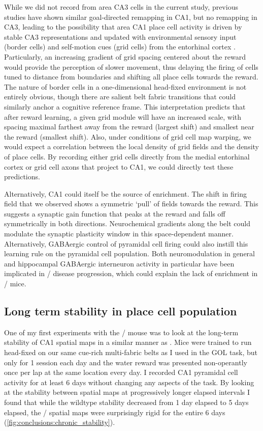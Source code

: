 While we did not record from area CA3 cells in the current study, previous studies \citep{Dupret2010a} have shown similar goal-directed remapping in CA1, but no remapping in CA3, leading to the possibility that area CA1 place cell activity is driven by stable CA3 representations and updated with environmental sensory input (border cells) and self-motion cues (grid cells) from the entorhinal cortex \citep{Bush2014a}.
Particularly, an increasing gradient of grid spacing centered about the reward would provide the perception of slower movement, thus delaying the firing of cells tuned to distance from boundaries and shifting all place cells towards the reward. The nature of border cells in a one-dimensional head-fixed environment is not entirely obvious, though there are salient belt fabric transitions that could similarly anchor a cognitive reference frame.
This interpretation predicts that after reward learning, a given grid module will have an increased scale, with spacing maximal farthest away from the reward (largest shift) and smallest near the reward (smallest shift).
Also, under conditions of grid cell map warping, we would expect a correlation between the local density of grid fields and the density of place cells.
By recording either grid cells directly from the medial entorhinal cortex or grid cell axons that project to CA1, we could directly test these predictions.

Alternatively, CA1 could itself be the source of enrichment.
The shift in firing field that we observed shows a symmetric `pull' of fields towards the reward.
This suggests a synaptic gain function that peaks at the reward and falls off symmetrically in both directions. Neurochemical gradients along the belt could modulate the synaptic plasticity window in this space-dependent manner. Alternatively, GABAergic control of pyramidal cell firing could also instill this learning rule on the pyramidal cell population. Both neuromodulation in general and  hippocampal GABAergic interneuron activity in particular have been implicated in \scz/ disease progression, which could explain the lack of enrichment in \df/ mice.

\subsection{Long term stability in place cell population}
\label{sec:conclusions:chronic}
One of my first experiments with the \df/ mouse was to look at the long-term stability of CA1 spatial maps in a similar manner as \citeauthor{Ziv2013}.
Mice were trained to run head-fixed on our same cue-rich multi-fabric belts as I used in the \ac{GOL} task, but only for 1 session each day and the water reward was presented non-operantly once per lap at the same location every day.
I recorded CA1 pyramidal cell activity for at least 6 days without changing any aspects of the task.
By looking at the stability between spatial maps at progressively longer elapsed intervals I found that while the wildtype stability decreased from 1 day elapsed to 5 days elapsed, the \df/ spatial maps were surprisingly rigid for the entire 6 days (\autoref{fig:conclusions:chronic_stability}).

